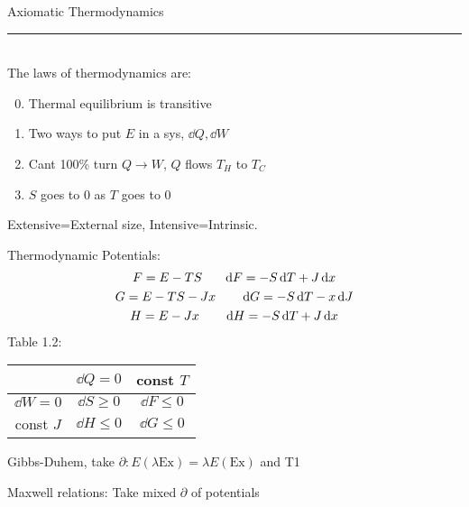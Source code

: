 \documentclass[8pt]{article}
\begin{document}
\small
\begin{multicols*}{2}
  \begin{center}
    \large{Axiomatic Thermodynamics}
  \end{center}
    \hrule~\\
  The laws of thermodynamics are:
  \begin{enumerate}
  \setcounter{enumi}{-1}
  \item Thermal equilibrium is transitive
  \item Two ways to put $E$ in a sys, $\dd{Q},\dd{W}$
  \item Cant 100\% turn $Q\to W$, $Q$ flows $T_H$ to $T_C$
  \item $S$ goes to 0 as $T$ goes to 0
  \end{enumerate}
  Extensive=External size, Intensive=Intrinsic.

  Thermodynamic Potentials:
  \begin{gather*}
    \footnotesize
    F=E-TS \qquad \dd{F}=-S\dd{T}+J\dd{x}\\
    G=E-TS-Jx \qquad \dd{G}=-S\dd{T}-x\dd{J}\\
    H=E-Jx \qquad \dd{H}=-S\dd{T}+J\dd{x}
  \end{gather*}
  Table 1.2:
  \begin{table}[H]
    \footnotesize
    \centering
    \begin{tabular}{|c|cc|}
      \hline&$\dd{Q}=0$ & const $T$ \\\hline
      $\dd{W}=0$ & $\dd{S}\geq0$ & $\dd{F}\leq0$\\
      const $J$ & $\dd{H}\leq0$ & $\dd{G}\leq0$ \\\hline
    \end{tabular}
  \end{table}

  Gibbs-Duhem, take $\partial: E(\lambda\text{Ex})=\lambda E(\text{Ex})$ and T1
  
  Maxwell relations: Take mixed $\partial$ of potentials
  

\end{multicols*}
\end{document}
